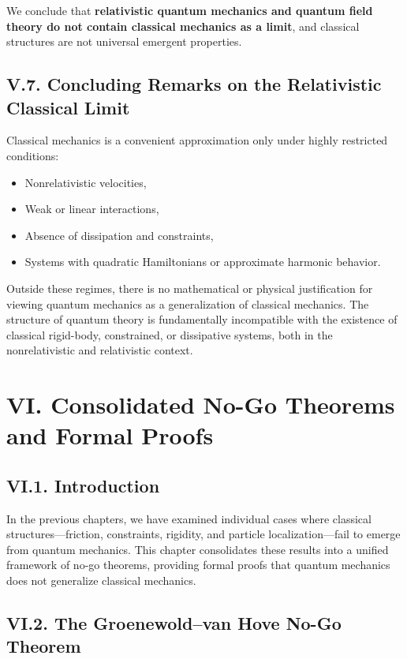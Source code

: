 \documentclass[12pt,oneside]{book}
\theoremstyle{plain}
\theoremstyle{definition}
\begin{document}
We conclude that \textbf{relativistic quantum mechanics and quantum field theory do not contain classical mechanics as a limit}, and classical structures are not universal emergent properties.

\section{V.7. Concluding Remarks on the Relativistic Classical Limit}

Classical mechanics is a convenient approximation only under highly restricted conditions:

\begin{itemize}
    \item Nonrelativistic velocities,
    \item Weak or linear interactions,
    \item Absence of dissipation and constraints,
    \item Systems with quadratic Hamiltonians or approximate harmonic behavior.
\end{itemize}

Outside these regimes, there is no mathematical or physical justification for viewing quantum mechanics as a generalization of classical mechanics. The structure of quantum theory is fundamentally incompatible with the existence of classical rigid-body, constrained, or dissipative systems, both in the nonrelativistic and relativistic context.


\chapter{VI. Consolidated No-Go Theorems and Formal Proofs}

\section{VI.1. Introduction}

In the previous chapters, we have examined individual cases where classical structures—friction, constraints, rigidity, and particle localization—fail to emerge from quantum mechanics. This chapter consolidates these results into a unified framework of no-go theorems, providing formal proofs that quantum mechanics does not generalize classical mechanics.

\section{VI.2. The Groenewold–van Hove No-Go Theorem}
\end{document}
